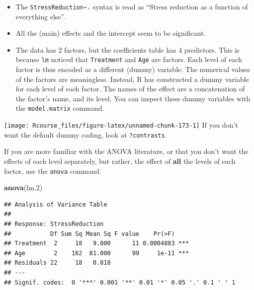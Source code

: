 \documentclass[]{book}
\newenvironment{Shaded}{\begin{snugshade}}{\end{snugshade}}
\newcommand{\KeywordTok}[1]{\textcolor[rgb]{0.13,0.29,0.53}{\textbf{#1}}}
\newcommand{\DecValTok}[1]{\textcolor[rgb]{0.00,0.00,0.81}{#1}}
\newcommand{\StringTok}[1]{\textcolor[rgb]{0.31,0.60,0.02}{#1}}
\newcommand{\OperatorTok}[1]{\textcolor[rgb]{0.81,0.36,0.00}{\textbf{#1}}}
\newcommand{\NormalTok}[1]{#1}
\theoremstyle{definition}
\theoremstyle{definition}
\theoremstyle{definition}
\theoremstyle{remark}
\begin{document}
\begin{itemize}
\item
  The \texttt{StressReduction\textasciitilde{}.} syntax is read as
  ``Stress reduction as a function of everything else''.
\item
  All the (main) effects and the intercept seem to be significant.
\item
  The data has 2 factors, but the coefficients table has 4 predictors.
  This is because \texttt{lm} noticed that \texttt{Treatment} and
  \texttt{Age} are factors. Each level of each factor is thus encoded as
  a different (dummy) variable. The numerical values of the factors are
  meaningless. Instead, R has constructed a dummy variable for each
  level of each factor. The names of the effect are a concatenation of
  the factor's name, and its level. You can inspect these dummy
  variables with the \texttt{model.matrix} command.
\end{itemize}

\begin{Shaded}
\end{Shaded}

\texttt{[image: Rcourse\_files/figure-latex/unnamed-chunk-173-1]}
If you don't want the default dummy coding, look at \texttt{?contrasts}.

If you are more familiar with the ANOVA literature, or that you don't
want the effects of each level separately, but rather, the effect of
\textbf{all} the levels of each factor, use the \texttt{anova} command.

\begin{Shaded}
\begin{Highlighting}[]
\KeywordTok{anova}\NormalTok{(lm.}\DecValTok{2}\NormalTok{)}
\end{Highlighting}
\end{Shaded}

\begin{verbatim}
## Analysis of Variance Table
## 
## Response: StressReduction
##           Df Sum Sq Mean Sq F value    Pr(>F)    
## Treatment  2     18   9.000      11 0.0004883 ***
## Age        2    162  81.000      99     1e-11 ***
## Residuals 22     18   0.818                      
## ---
## Signif. codes:  0 '***' 0.001 '**' 0.01 '*' 0.05 '.' 0.1 ' ' 1
\end{verbatim}
\end{document}
